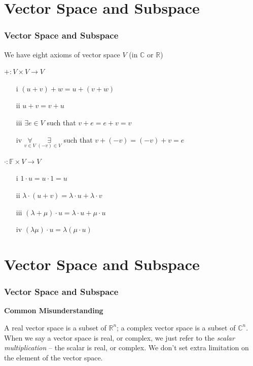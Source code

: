 \documentclass[12pt, t]{beamer}
\renewcommand{\emph}[1]{{\color{Turquoise3}\textsl{#1}}}
\begin{document}
\section{Vector Space and Subspace}
\begin{frame}
    \frametitle{Vector Space and Subspace}

    We have eight axioms of vector space $V$ (in $\mathbb{C}$ or $\mathbb{R}$)\\

    \begin{center}
        \emph{\center $+:V\times V\rightarrow V$}
    \end{center}

    \begin{enumerate}
        \item[i]    $(u+v)+w=u+(v+w)$
        \item[ii]   $u+v=v+u$
        \item[iii]  $\exists e\in V$ such that $v+e=e+v=v$
        \item[iv]   $\underset{v\in V}{\forall}\ \underset{(-v)\in V}{\exists}$ such that $v+(-v)=(-v)+v=e$
    \end{enumerate}

    \begin{center}
        \emph{\center $\cdot:\mathbb{F}\times V\rightarrow V$}
    \end{center}

    \begin{enumerate}
        \item[i]    $1\cdot u=u\cdot 1=u$
        \item[ii]   $\lambda\cdot(u+v)=\lambda\cdot u+\lambda\cdot v$
        \item[iii]  $(\lambda+\mu)\cdot u=\lambda\cdot u+\mu\cdot u$
        \item[iv]   $(\lambda\mu)\cdot u=\lambda(\mu\cdot u)$
    \end{enumerate}

\end{frame}


\section{Vector Space and Subspace}
\begin{frame}
    \frametitle{Vector Space and Subspace}
    \begin{center}
        \center \textbf{Common Misunderstanding}
    \end{center}
    \vspace{1em}
    A real vector space is a subset of $\mathbb{R}^n$; a complex vector space is a subset of $\mathbb{C}^n$.\\
    \vspace{1em}
    \hspace{1em}
    When we say a vector space is real, or complex, we just refer to the \emph{scalar multiplication} – the scalar is real, or complex. We don’t set extra limitation on the element of the vector space.

\end{frame}
\end{document}
